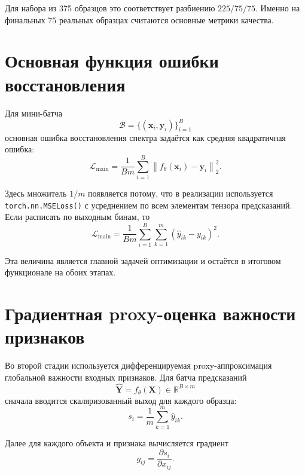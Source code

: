 \documentclass[11pt]{article}
\begin{document}
Для набора из 375 образцов это соответствует разбиению $225/75/75$. Именно на финальных $75$ реальных образцах считаются основные метрики качества.

\section{Основная функция ошибки восстановления}

Для мини-батча
\begin{equation}
\mathcal{B} = \{(\mathbf{x}_i, \mathbf{y}_i)\}_{i=1}^{B}
\end{equation}
основная ошибка восстановления спектра задаётся как средняя квадратичная ошибка:
\begin{equation}
\mathcal{L}_{\mathrm{main}} = \frac{1}{Bm} \sum_{i=1}^{B} \left\| f_{\theta}(\mathbf{x}_i) - \mathbf{y}_i \right\|_2^2.
\end{equation}

Здесь множитель $1/m$ появляется потому, что в реализации используется \texttt{torch.nn.MSELoss()} с усреднением по всем элементам тензора предсказаний. Если расписать по выходным бинам, то
\begin{equation}
\mathcal{L}_{\mathrm{main}} = \frac{1}{Bm} \sum_{i=1}^{B} \sum_{k=1}^{m} (\hat{y}_{ik} - y_{ik})^2.
\end{equation}

Эта величина является главной задачей оптимизации и остаётся в итоговом функционале на обоих этапах.

\section{Градиентная proxy-оценка важности признаков}

Во второй стадии используется дифференцируемая proxy-аппроксимация глобальной важности входных признаков. Для батча предсказаний
\begin{equation}
\hat{\mathbf{Y}} = f_{\theta}(\mathbf{X}) \in \mathbb{R}^{B \times m}
\end{equation}
сначала вводится скаляризованный выход для каждого образца:
\begin{equation}
 s_i = \frac{1}{m} \sum_{k=1}^{m} \hat{y}_{ik}.
\end{equation}

Далее для каждого объекта и признака вычисляется градиент
\begin{equation}
 g_{ij} = \frac{\partial s_i}{\partial x_{ij}}.
\end{equation}
\end{document}

